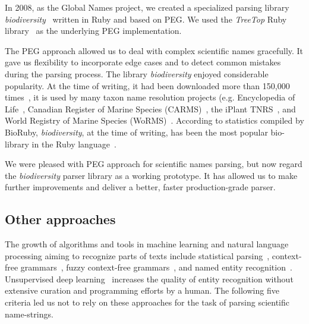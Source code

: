 \documentclass{bmcart}
\begin{document}
In 2008, as the Global Names project, we created a specialized parsing library \textit{biodiversity}~\cite{biodiversity} written in Ruby and based on PEG\@. We used the \textit{TreeTop} Ruby library~\cite{treetop} as the underlying PEG implementation.

The PEG approach allowed us to deal with complex scientific names gracefully.  It gave us flexibility to incorporate edge cases and to detect common mistakes during the parsing process. The library \textit{biodiversity} enjoyed considerable popularity. At the time of writing, it had been downloaded more than 150,000 times~\cite{bdiv-downloads}, it is used by many taxon name resolution projects (e.g. Encyclopedia of Life~\cite{eol}, Canadian Register of Marine Species (CARMS)~\cite{carms}, the iPlant TNRS~\cite{iplant}, and World Registry of Marine Species (WoRMS)~\cite{worms}. According to statistics compiled by BioRuby, \textit{biodiversity}, at the time of writing, has been the most popular bio-library in the Ruby language~\cite{biogems}.

We were pleased with PEG approach for scientific names parsing, but now regard the \textit{biodiversity} parser library as a working prototype. It has allowed us to make further improvements and deliver a better, faster production-grade parser.

\subsection*{Other approaches}


The  growth of algorithms and tools in machine learning and natural language processing aiming to recognize parts of texts include statistical parsing~\cite{charniak1996statistical}, context-free grammars~\cite{aho1972theory}, fuzzy context-free grammars~\cite{asveld1995fuzzy}, and named entity recognition~\cite{nadeau2007survey}. Unsupervised deep learning~\cite{mikolov2013distributed, schmidhuber2015deep} increases the quality of entity recognition without extensive curation and programming efforts by a human. The following five criteria led us not to rely on these approaches for the task of parsing scientific name-strings.
\end{document}
